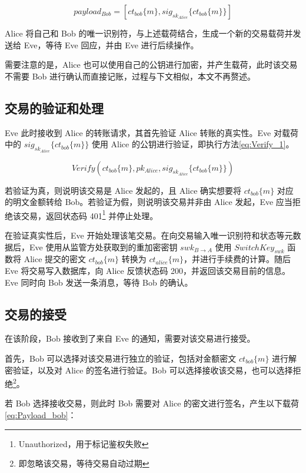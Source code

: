 \begin{equation} \label{eq:payload}
payload_{Bob} = [ct_{bob}\{m\}, sig_{sk_{Alice}}\{ct_{bob}\{m\}\}]    
\end{equation}

Alice 将自己和 Bob 的唯一识别符，与上述载荷结合，生成一个新的交易载荷并发送给 Eve，等待 Eve 回应，并由 Eve 进行后续操作。

需要注意的是，Alice 也可以使用自己的公钥进行加密，并产生载荷，此时该交易不需要 Bob 进行确认而直接记账，过程与下文相似，本文不再赘述。

\subsection{交易的验证和处理}

Eve 此时接收到 Alice 的转账请求，其首先验证 Alice 转账的真实性。Eve 对载荷中的 $sig_{sk_{Alice}}\{ct_{bob}\{m\}\}$ 使用 Alice 的公钥进行验证，即执行方法\eqref{eq:Verify_1}。

\begin{equation} \label{eq:Verify_1}
    Verify(ct_{bob}\{m\}, pk_{Alice}, sig_{sk_{Alice}}\{ct_{bob}\{m\}\})
\end{equation}

若验证为真，则说明该交易是 Alice 发起的，且 Alice 确实想要将 $ct_{bob}\{m\}$  对应的明文金额转给 Bob。若验证为假，则说明该交易并非由 Alice 发起，Eve 应当拒绝该交易，返回状态码 401\footnote{Unauthorized，用于标记鉴权失败} 并停止处理。

在验证真实性后，Eve 开始处理该笔交易。在向交易输入唯一识别符和状态等元数据后，Eve 使用从监管方处获取到的重加密密钥 $swk_{B \rightarrow A}$ 使用 $SwitchKey_{swk}$ 函数将 Alice 提交的密文 $ct_{bob}\{m\}$ 转换为 $ct_{alice}\{m\}$，并进行手续费的计算。随后 Eve 将交易写入数据库，向 Alice 反馈状态码 200，并返回该交易目前的信息。Eve 同时向 Bob 发送一条消息，等待 Bob 的确认。

\subsection*{交易的接受}

在该阶段，Bob 接收到了来自 Eve 的通知，需要对该交易进行接受。

首先，Bob 可以选择对该交易进行独立的验证，包括对金额密文 $ct_{bob}\{m\}$ 进行解密验证，以及对 Alice 的签名进行验证。Bob 可以选择接收该交易，也可以选择拒绝\footnote{即忽略该交易，等待交易自动过期}。

若 Bob 选择接收交易，则此时 Bob 需要对 Alice 的密文进行签名，产生以下载荷\eqref{eq:Payload_bob}：

